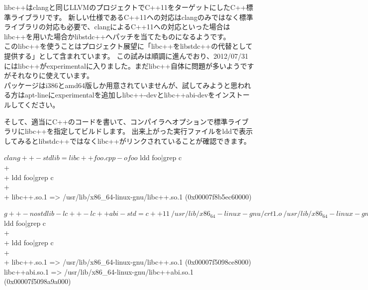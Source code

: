 \documentclass[mingoth,a4paper]{jsarticle}
\begin{document}
libc++はclangと同じLLVMのプロジェクトでC++11をターゲットにしたC++標準ライブラリです。
新しい仕様であるC++11への対応はclangのみではなく標準ライブラリの対応も必要で、clangによるC++11への対応といった場合はlibc++を用いた場合かlibstdc++へパッチを当てたものになるようです。
\cite{clang11support}
\\

このlibc++を使うことはプロジェクト展望に「libc++をlibstdc++の代替として提供する」\cite{altlibc++}として含まれています。
この試みは順調に進んでおり、2012/07/31にはlibc++がexperimentalに入りました。まだlibc++自体に問題が多いようですがそれなりに使えています。
\\

パッケージはi386とamd64版しか用意されていませんが、試してみようと思われる方はapt-lineにexperimentalを追加しlibc++-devとlibc++abi-devをインストールしてください。


そして、適当にC++のコードを書いて、コンパイラへオプションで標準ライブラリにlibc++を指定してビルドします。
出来上がった実行ファイルをlddで表示してみるとlibstdc++ではなくlibc++がリンクされていることが確認できます。
\cite{newc++stdlibindebian}

\begin{commandline}
$ clang++ -stdlib=libc++ foo.cpp -o foo
$ ldd foo|grep c\\+\\+
ldd foo|grep c\\+\\+
  libc++.so.1 => /usr/lib/x86_64-linux-gnu/libc++.so.1 (0x00007f8b5ec60000)
\end{commandline}

\begin{commandline}
$ g++ -nostdlib -lc++ -lc++abi -std=c++11 \
  /usr/lib/x86_64-linux-gnu/crt1.o \
  /usr/lib/x86_64-linux-gnu/crti.o \
  /usr/lib/x86_64-linux-gnu/crtn.o \
  -isystem /usr/include/c++/v1 -lc -lgcc_s \
  foo.cpp -o foo
$ ldd foo|grep c\\+\\+
ldd foo|grep c\\+\\+
  libc++.so.1 => /usr/lib/x86_64-linux-gnu/libc++.so.1 (0x00007f5098ce8000)
  libc++abi.so.1 => /usr/lib/x86_64-linux-gnu/libc++abi.so.1 (0x00007f5098a9a000)
\end{commandline}
\end{document}
